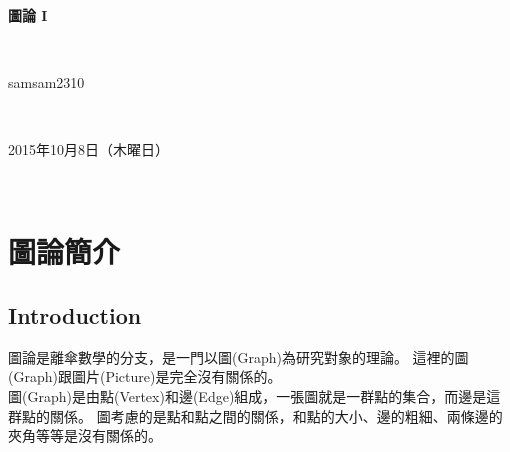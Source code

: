 \documentclass{article}
\title{\hmwkClass}
\author{\hmwkAuthorName}
\date{\hmwkDueDate}
\def\normalsize{\fontsize{12}{16}\selectfont}
\def\large{\fontsize{16}{24}\selectfont}
\def\LARGE{\fontsize{24}{36}\selectfont}
\newcommand{\hmwkDueDate}{2015年10月8日（木曜日）} %
\newcommand{\hmwkClass}{圖論 I} %
\newcommand{\hmwkAuthorName}{samsam2310} %
\begin{document}
\LARGE~\\[4ex]
\centerline{\bf\hmwkClass}\large\\[2ex]\centerline{\hmwkAuthorName}\\[2ex]\centerline{\hmwkDueDate}\\
\normalsize


\section{圖論簡介}
\subsection*{Introduction}
圖論是離傘數學的分支，是一門以圖(Graph)為研究對象的理論。
這裡的圖(Graph)跟圖片(Picture)是完全沒有關係的。\\
圖(Graph)是由點(Vertex)和邊(Edge)組成，一張圖就是一群點的集合，而邊是這群點的關係。
圖考慮的是點和點之間的關係，和點的大小、邊的粗細、兩條邊的夾角等等是沒有關係的。
\end{document}
